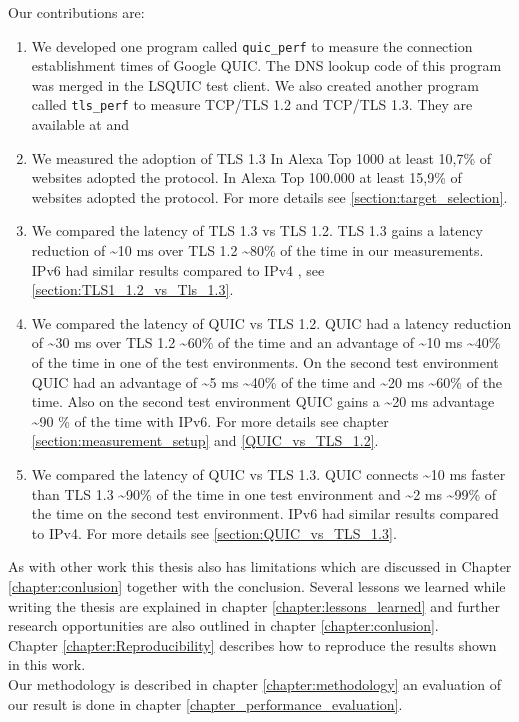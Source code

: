 Our contributions are:
\begin{enumerate}
\item We developed one program called \texttt{quic\_perf} to measure the connection establishment times of Google QUIC.
The DNS lookup code of this program was merged in the LSQUIC test client.
We also created another program called \texttt{tls\_perf} to measure TCP/TLS 1.2 and TCP/TLS 1.3.
They are available at  \cite{Link:tls_perfGithub} and \cite{Link:quic_perfGithub}
\item We measured the adoption of TLS 1.3
In Alexa Top 1000 at least 10,7\% of websites adopted the protocol.
In Alexa Top 100.000 at least 15,9\% of websites adopted the protocol.
For more details see \ref{section:target_selection}.
\item We compared the latency of TLS 1.3 vs TLS 1.2. 
TLS 1.3 gains a latency reduction of \textasciitilde 10 ms over TLS 1.2  \textasciitilde 80\% of the time in our measurements. IPv6 had similar results compared to IPv4 , see \ref{section:TLS1_1.2_vs_Tls_1.3}.
\item We compared the latency of QUIC vs TLS 1.2.
QUIC had a latency reduction of \textasciitilde 30 ms over TLS 1.2 \textasciitilde 60\% of the time and an advantage of \textasciitilde 10 ms \textasciitilde 40\% of the time in one of the test environments.
On the second test environment QUIC had an advantage of \textasciitilde 5 ms \textasciitilde 40\% of the time and \textasciitilde 20 ms \textasciitilde 60\% of the time.
Also on the second test environment QUIC gains a \textasciitilde 20 ms advantage \textasciitilde 90 \% of the time with IPv6.
For more details see chapter \ref{section:measurement_setup} and \ref{QUIC_vs_TLS_1.2}.
\item We compared the latency of QUIC vs TLS 1.3.
QUIC connects \textasciitilde 10 ms faster than TLS 1.3 \textasciitilde 90\% of the time in one test environment and \textasciitilde 2 ms  \textasciitilde 99\% of the time on the second test environment.
IPv6 had similar results compared to IPv4.
For more details see \ref{section:QUIC_vs_TLS_1.3}.
\end{enumerate}

As with other work this thesis also has limitations which are discussed in Chapter \ref{chapter:conlusion} together with the conclusion.
Several lessons we learned while writing the thesis are explained in chapter \ref{chapter:lessons_learned} and further research opportunities are also outlined in chapter \ref{chapter:conlusion}.\\
Chapter \ref{chapter:Reproducibility} describes how to reproduce the results shown in this work.\\
Our methodology is described in chapter \ref{chapter:methodology} an evaluation of our result is done in chapter \ref{chapter_performance_evaluation}.